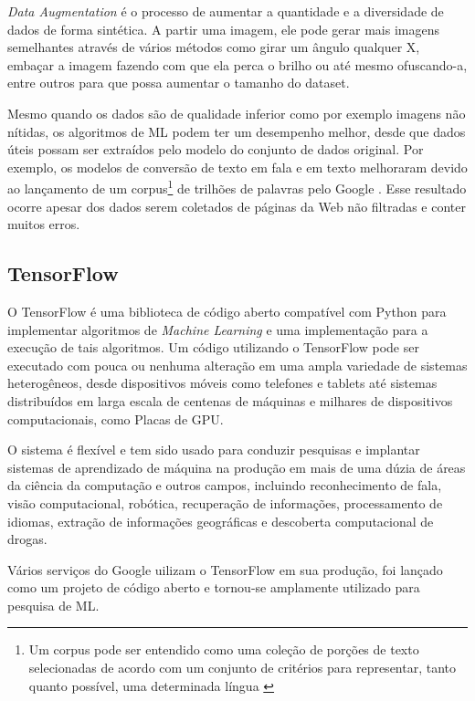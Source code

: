 \textit{Data Augmentation} é o processo de aumentar a quantidade e a diversidade de dados de forma sintética. A partir uma imagem, ele pode gerar mais imagens semelhantes através de vários métodos como girar um ângulo qualquer X, embaçar a imagem fazendo com que ela perca o brilho ou até mesmo ofuscando-a, entre outros para que possa aumentar o tamanho do dataset.

Mesmo quando os dados são de qualidade inferior como por exemplo imagens não nítidas, os algoritmos de ML podem ter um desempenho melhor, desde que dados úteis possam ser extraídos pelo modelo do conjunto de dados original. Por exemplo, os modelos de conversão de texto em fala e em texto melhoraram devido ao lançamento de um corpus\footnote{Um corpus pode ser entendido como uma coleção de porções de texto selecionadas de acordo com um conjunto de critérios para representar, tanto quanto possível, uma determinada língua \cite{sinclair2005corpus}} de trilhões de palavras pelo Google \cite{halevy2009unreasonable}. Esse resultado ocorre apesar dos dados serem coletados de páginas da Web não filtradas e conter muitos erros.\cite{dataAug}


\subsection{TensorFlow}

O TensorFlow é uma biblioteca de código aberto compatível com Python para implementar algoritmos de \textit{Machine Learning} e uma implementação para a execução de tais algoritmos. Um código utilizando o TensorFlow pode ser executado com pouca ou nenhuma alteração em uma ampla variedade de sistemas heterogêneos, desde dispositivos móveis como telefones e tablets até sistemas distribuídos em larga escala de centenas de máquinas e milhares de dispositivos computacionais, como Placas de GPU. 

O sistema é flexível e tem sido usado para conduzir pesquisas e implantar sistemas de aprendizado de máquina na produção em mais de uma dúzia de áreas da ciência da computação e outros campos, incluindo reconhecimento de fala, visão computacional, robótica, recuperação de informações, processamento de idiomas, extração de informações geográficas e descoberta computacional de drogas. \cite{abadi2016tensorflow}

Vários serviços do Google uilizam o TensorFlow em sua produção, foi lançado como um projeto de código aberto e
tornou-se amplamente utilizado para pesquisa de ML.\cite{199317}

